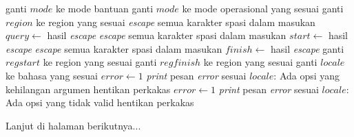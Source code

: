 \begin{algorithm}[h]
\begin{algorithmic}
					 
						\State ganti $mode$ ke mode bantuan
					\EndIf
				\EndCase
						\State ganti $mode$ ke mode operasional yang sesuai
					\EndIf
				\EndCase
					\State ganti $region$ ke region yang sesuai
				\EndCase
						\State \textit{escape} semua karakter spasi dalam masukan
						\State $query \gets$ hasil \textit{escape}
					\EndIf
				\EndCase
						\State \textit{escape} semua karakter spasi dalam masukan
						\State $start \gets$ hasil \textit{escape}
					\EndIf
				\EndCase
						\State \textit{escape} semua karakter spasi dalam masukan
						\State $finish \gets$ hasil \textit{escape}
					\EndIf
				\EndCase
					\State ganti $regstart$ ke region yang sesuai
				\EndCase
					\State ganti $regfinish$ ke region yang sesuai
				\EndCase
					\State ganti $locale$ ke bahasa yang sesuai
				\EndCase
				\Case{\textquotesingle :\textquotesingle}
					\State $error \gets 1$
					\State \textit{print} pesan \textit{error} sesuai $locale$: Ada opsi yang kehilangan argumen
					\State hentikan perkakas
				\EndCase
					\State $error \gets 1$
					\State \textit{print} pesan \textit{error} sesuai $locale$: Ada opsi yang tidak valid
					\State hentikan perkakas
				\EndCase
			\EndSwitch
		\EndWhile
	\end{algorithmic}
	\begin{flushright}
		Lanjut di halaman berikutnya...
	\end{flushright}
	\vspace{-0.95\baselineskip}
\end{algorithm}
